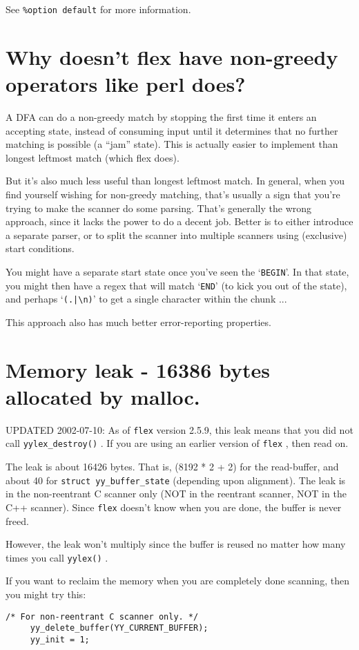 \documentclass[openany,oneside]{book}
\begin{document}
See \verb`%option default` for more information.
\section{Why doesn't flex have non-greedy operators like perl does?}


A DFA can do a non-greedy match by stopping
the first time it enters an accepting state, instead of consuming input until
it determines that no further matching is possible (a “jam” state).  This
is actually easier to implement than longest leftmost match (which flex does).

But it's also much less useful than longest leftmost match.  In general,
when you find yourself wishing for non-greedy matching, that's usually a
sign that you're trying to make the scanner do some parsing.  That's
generally the wrong approach, since it lacks the power to do a decent job. 
Better is to either introduce a separate parser, or to split the scanner
into multiple scanners using (exclusive) start conditions.

You might have
a separate start state once you've seen the ‘\verb`BEGIN`’. In that state, you
might then have a regex that will match ‘\verb`END`’ (to kick you out of the
state), and perhaps ‘\verb`(.|\n)`’ to get a single character within the chunk ...

This approach also has much better error-reporting properties.
\section{Memory leak - 16386 bytes allocated by malloc.}


UPDATED 2002-07-10: As of \verb`flex` version 2.5.9, this leak means that you did not
call \verb`yylex_destroy()` . If you are using an earlier version of \verb`flex` , then read
on.

The leak is about 16426 bytes.  That is, (8192 * 2 + 2) for the read-buffer, and
about 40 for \verb`struct yy_buffer_state` (depending upon alignment). The leak is in
the non-reentrant C scanner only (NOT in the reentrant scanner, NOT in the C++
scanner). Since \verb`flex` doesn't know when you are done, the buffer is never freed.

However, the leak won't multiply since the buffer is reused no matter how many
times you call \verb`yylex()` .

If you want to reclaim the memory when you are completely done scanning, then
you might try this:
\begin{verbatim}
/* For non-reentrant C scanner only. */
     yy_delete_buffer(YY_CURRENT_BUFFER);
     yy_init = 1;
\end{verbatim}
\end{document}
